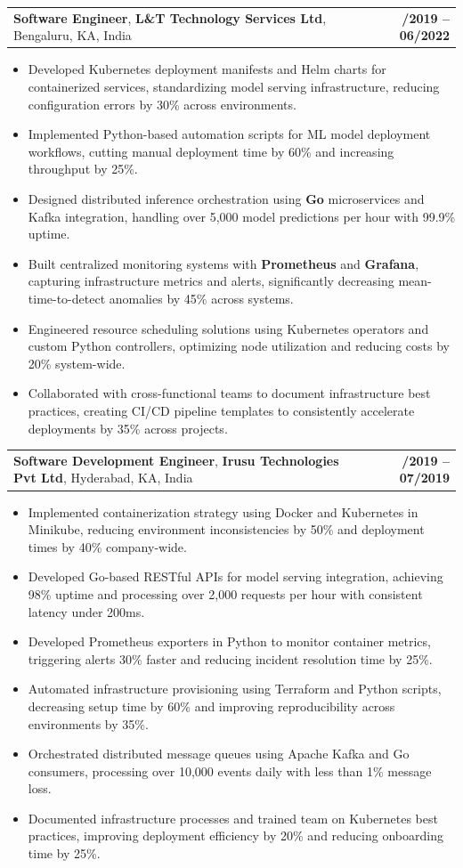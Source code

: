 \documentclass[letterpaper,11pt]{article}
\makeatletter
\newcommand{\resumeItem}[1]{
  \item\footnotesize{
    {#1 \vspace{-2pt}}
  }
}
\newcommand{\resumeSubheading}[4]{
  \vspace{-2pt}\item
    \begin{tabular*}{1.0\textwidth}[t]{l@{\extracolsep{\fill}}r}
      \textbf{\fontsize{10pt}{14pt}\selectfont #3}, \textbf{\fontsize{10pt}{14pt}\selectfont #1}, \fontsize{10pt}{14pt}\selectfont #4 & \textbf{\fontsize{10pt}{14pt}\selectfont #2} \\
    \end{tabular*}\vspace{-7pt}
}
\newcommand{\resumeItemListStart}{\begin{itemize}[leftmargin=*]}
\newcommand{\resumeItemListEnd}{\end{itemize}\vspace{-5pt}}
\makeatother
\begin{document}
    \resumeSubheading
        {L\&T Technology Services Ltd}{08/2019 -- 06/2022}
        {Software Engineer}{Bengaluru, KA, India}
      \resumeItemListStart
        \resumeItem{Developed Kubernetes deployment manifests and Helm charts for containerized services, standardizing model serving infrastructure, reducing configuration errors by 30\% across environments.}
        \resumeItem{Implemented Python-based automation scripts for ML model deployment workflows, cutting manual deployment time by 60\% and increasing throughput by 25\%.}
        \resumeItem{Designed distributed inference orchestration using \textbf{Go} microservices and Kafka integration, handling over 5,000 model predictions per hour with 99.9\% uptime.}
        \resumeItem{Built centralized monitoring systems with \textbf{Prometheus} and \textbf{Grafana}, capturing infrastructure metrics and alerts, significantly decreasing mean-time-to-detect anomalies by 45\% across systems.}
        \resumeItem{Engineered resource scheduling solutions using Kubernetes operators and custom Python controllers, optimizing node utilization and reducing costs by 20\% system-wide.}
        \resumeItem{Collaborated with cross-functional teams to document infrastructure best practices, creating CI/CD pipeline templates to consistently accelerate deployments by 35\% across projects.}
      \resumeItemListEnd

    \resumeSubheading
        {Irusu Technologies Pvt Ltd}{01/2019 -- 07/2019}
        {Software Development Engineer}{Hyderabad, KA, India}
      \resumeItemListStart
        \resumeItem{Implemented containerization strategy using Docker and Kubernetes in Minikube, reducing environment inconsistencies by 50\% and deployment times by 40\% company-wide.}
        \resumeItem{Developed Go-based RESTful APIs for model serving integration, achieving 98\% uptime and processing over 2,000 requests per hour with consistent latency under 200ms.}
        \resumeItem{Developed Prometheus exporters in Python to monitor container metrics, triggering alerts 30\% faster and reducing incident resolution time by 25\%.}
        \resumeItem{Automated infrastructure provisioning using Terraform and Python scripts, decreasing setup time by 60\% and improving reproducibility across environments by 35\%.}
        \resumeItem{Orchestrated distributed message queues using Apache Kafka and Go consumers, processing over 10,000 events daily with less than 1\% message loss.}
        \resumeItem{Documented infrastructure processes and trained team on Kubernetes best practices, improving deployment efficiency by 20\% and reducing onboarding time by 25\%.}
      \resumeItemListEnd
\end{document}
